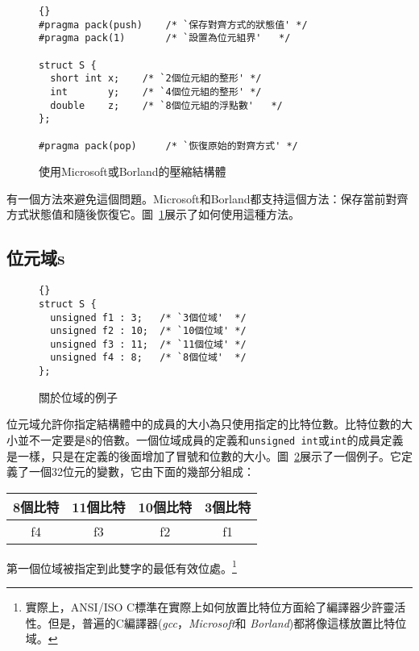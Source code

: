 \begin{figure}[t]
\lstset{escapeinside=`',language=Pascal,%
}
\begin{lstlisting}[frame=tlrb,stepnumber=0]{}
#pragma pack(push)    /* `保存對齊方式的狀態值' */
#pragma pack(1)       /* `設置為位元組界'   */

struct S {
  short int x;    /* `2個位元組的整形' */
  int       y;    /* `4個位元組的整形' */
  double    z;    /* `8個位元組的浮點數'   */
};

#pragma pack(pop)     /* `恢復原始的對齊方式' */
\end{lstlisting}
\caption{使用Microsoft或Borland的壓縮結構體 \label{fig:msPacked}}
\end{figure}

有一個方法來避免這個問題。Microsoft和Borland都支持這個方法：保存當前對齊方式狀態值和隨後恢復它。圖~\ref{fig:msPacked}展示了如何使用這種方法。

\subsection{位元域s}

\begin{figure}[t]
\lstset{escapeinside=`',language=Pascal,%
}
\begin{lstlisting}[frame=tlrb,stepnumber=0]{}
struct S {
  unsigned f1 : 3;   /* `3個位域'  */
  unsigned f2 : 10;  /* `10個位域' */
  unsigned f3 : 11;  /* `11個位域' */
  unsigned f4 : 8;   /* `8個位域'  */
};
\end{lstlisting}
\caption{關於位域的例子 \label{fig:bitStruct}}
\end{figure}

位元域允許你指定結構體中的成員的大小為只使用指定的比特位數。比特位數的大小並不一定要是8的倍數。一個位域成員的定義和\lstinline|unsigned int|或\lstinline|int|的成員定義是一樣，只是在定義的後面增加了冒號和位數的大小。圖~\ref{fig:bitStruct}展示了一個例子。它定義了一個32位元的變數，它由下面的幾部分組成：
\begin{center}
\begin{tabular}{|c|c|c|c|}
\multicolumn{1}{c}{8個比特} & \multicolumn{1}{c}{11個比特} &
\multicolumn{1}{c}{10個比特} & \multicolumn{1}{c}{3個比特} \\
\hline \hspace{2em} f4 \hspace{2em} & \hspace{3em} f3 \hspace{3em}
& \hspace{3em} f2 \hspace{3em} & f1 \\
\hline
\end{tabular}
\end{center}
第一個位域被指定到此雙字的最低有效位處。\footnote{實際上，ANSI/ISO C標準在實際上如何放置比特位方面給了編譯器少許靈活性。但是，普遍的C編譯器(\emph{gcc}，\emph{Microsoft}和
\emph{Borland})都將像這樣放置比特位域。}

